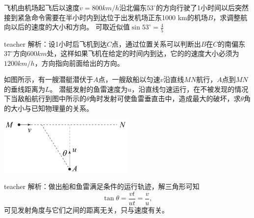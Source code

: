 \begin{example}
飞机由机场起飞后以速度$v=800\unit{km/h}$沿北偏东$53^\circ$的方向行驶了1小时间以后突然接到紧急命令需要在半小时内到达位于出发机场正东1000 km的机场$B$，求调整航向以后的速度的大小和方向。
可取近似值$\sin53^\circ = \frac{4}{5}$
\begin{taggedblock}{teacher}
\newline
解析：设1小时后飞机到达$C$点，通过位置关系可以判断出$B$在$C$的南偏东$37^\circ$方向$600\unit{km}$处，这样如果飞机在给定的时间内到达，它的的速度大小必须为$1200\unit{km/h}$，方向指向前面给出的方向。
\end{taggedblock}
\end{example}



\begin{example}
如图所示，有一艘潜艇潜伏于$A$点，一艘敌船以匀速$v$沿直线$MN$航行，$A$点到$MN$的垂线距离为$L$。
潜艇发射的鱼雷速度为$u$，沿直线匀速运行，在不被发现的情况下当敌船航行到图中所示的$\theta$角时发射可使鱼雷垂直击中，造成最大的破坏，求$\theta$角的大小与已知物理量的关系。

\begin{flushright}
\includegraphics[width = 0.5\textwidth]{images/motion-30.pdf} 
\end{flushright}
\begin{taggedblock}{teacher}
\noindent
解析：做出船和鱼雷满足条件的运行轨迹，解三角形可知
\[
\tan\theta = \frac{vt}{ut} = \frac{v}{u},
\]
可见发射角度与它们之间的距离无关，只与速度有关。
\vspace*{3cm}
\end{taggedblock}
\end{example}

